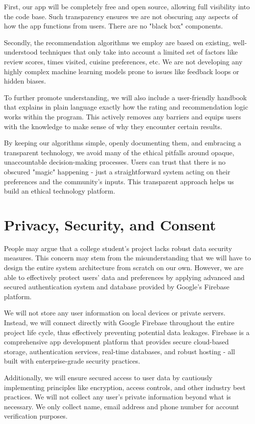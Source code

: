 \documentclass[10pt,twocolumn]{article}
\begin{document}
First, our app will be completely free and open source, allowing full visibility into the code base. Such transparency ensures we are not obscuring any aspects of how the app functions from users. There are no "black box" components.

Secondly, the recommendation algorithms we employ are based on existing, well-understood techniques that only take into account a limited set of factors like review scores, times visited, cuisine preferences, etc. We are not developing any highly complex machine learning models prone to issues like feedback loops or hidden biases.

To further promote understanding, we will also include a user-friendly handbook that explains in plain language exactly how the rating and recommendation logic works within the program. This actively removes any barriers and equips users with the knowledge to make sense of why they encounter certain results.

By keeping our algorithms simple, openly documenting them, and embracing a transparent technology, we avoid many of the ethical pitfalls around opaque, unaccountable decision-making processes. Users can trust that there is no obscured "magic" happening - just a straightforward system acting on their preferences and the community's inputs. This transparent approach helps us build an ethical technology platform.

\section{Privacy, Security, and Consent}
People may argue that a college student's project lacks robust data security measures. This concern may stem from the misunderstanding that we will have to design the entire system architecture from scratch on our own. However, we are able to effectively protect users' data and preferences by applying advanced and secured authentication system and database provided by Google's Firebase platform. 

We will not store any user information on local devices or private servers. Instead, we will connect directly with Google Firebase throughout the entire project life cycle, thus effectively preventing potential data leakages. Firebase is a comprehensive app development platform that provides secure cloud-based storage, authentication services, real-time databases, and robust hosting - all built with enterprise-grade security practices.

Additionally, we will ensure secured access to user data by cautiously implementing principles like encryption, access controls, and other industry best practices. We will not collect any user's private information beyond what is necessary. We only collect name, email address and phone number for account verification purposes. 
\end{document}
